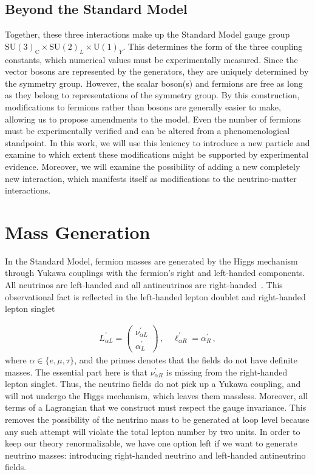 \subsection{Beyond the Standard Model}
Together, these three interactions make up the Standard Model gauge group $\mathrm{SU}(3)_{\mathrm{C}} \times \mathrm{SU}(2)_{L} \times \mathrm{U}(1)_{Y}$. 
This determines the form of the three coupling constants, which numerical values must be experimentally measured. 
Since the vector bosons are represented by the generators, they are uniquely determined by the symmetry group. However, the scalar boson(s) and fermions are free as long as they
belong to representations of the symmetry group. By this construction, modifications to fermions rather than bosons are generally easier to make, allowing us to propose amendments to the model. Even the
number of fermions must be experimentally verified and can be altered from a phenomenological standpoint. In this work,
we will use this leniency to introduce a new particle and examine to which extent 
these modifications might be supported by experimental evidence. Moreover, we will examine the possibility of adding a new completely new interaction, which manifests itself as modifications to the neutrino-matter interactions.

\section{Mass Generation}
In the Standard Model, fermion masses are generated by the Higgs mechanism through Yukawa couplings with the fermion's right and left-handed components.
All neutrinos are left-handed and all antineutrinos are right-handed~\cite{giunti}. This observational fact is reflected in the 
left-handed lepton doublet and right-handed lepton singlet

\begin{align}
    L^\prime_{\alpha L} = \begin{pmatrix}
            \nu^\prime_{\alpha L} \\
        \alpha^\prime_{L} 
    \end{pmatrix}\,, \quad
    \ell^\prime_{\alpha R} =
    \alpha^\prime_{R} \,,            
\end{align}
where $\alpha \in \{e,\mu,\tau\}$, and the primes denotes that the fields do not have definite masses.
The essential part here is that $\nu^\prime_{\alpha R}$ is missing from the right-handed lepton singlet.
Thus, the neutrino fields do not pick up a Yukawa coupling, 
and will not undergo the Higgs mechanism, which leaves them massless.
Moreover, all terms of a Lagrangian that we construct must respect the gauge invariance. This removes the possibility of the neutrino mass to be 
generated at loop level because any such attempt will violate the total lepton number by two units.
In order to keep our theory renormalizable, we have one option left if we want to generate neutrino masses: introducing right-handed neutrino and left-handed antineutrino fields. 


